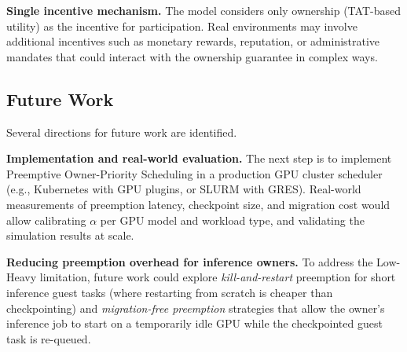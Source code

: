 \textbf{Single incentive mechanism.}
The model considers only ownership (TAT-based utility) as the incentive
for participation.
Real environments may involve additional incentives such as monetary rewards,
reputation, or administrative mandates that could interact with
the ownership guarantee in complex ways.


\subsection{Future Work}
\label{sec:future_work}


Several directions for future work are identified.


\textbf{Implementation and real-world evaluation.}
The next step is to implement Preemptive Owner-Priority Scheduling
in a production GPU cluster scheduler (e.g., Kubernetes with GPU plugins,
or SLURM with GRES).
Real-world measurements of preemption latency, checkpoint size, and
migration cost would allow calibrating $\alpha$ per GPU model and
workload type, and validating the simulation results at scale.


\textbf{Reducing preemption overhead for inference owners.}
To address the Low-Heavy limitation, future work could explore
\emph{kill-and-restart} preemption for short inference guest tasks
(where restarting from scratch is cheaper than checkpointing) and
\emph{migration-free preemption} strategies that allow the owner's
inference job to start on a temporarily idle GPU while the
checkpointed guest task is re-queued.


